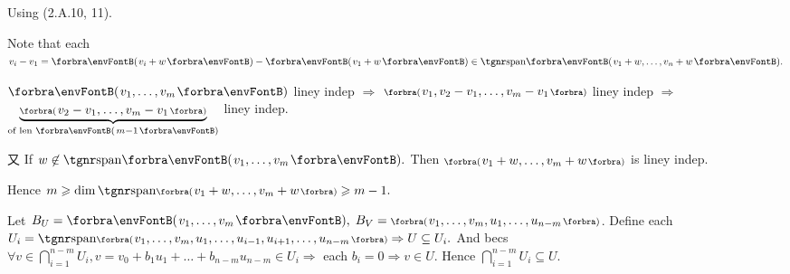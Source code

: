 
\SepLine

Using (2.A.10, 11).\par\quad
Note that each $v_i-v_1=\Par{v_i+w}-\Par{v_1+w}\in\Span{v_1+w,\dots,v_n+w}.$\par\quad
$\Par{v_1,\dots,v_m}$ liney indep $\Rightarrow$ $\BigPar{v_1,v_2-v_1,\dots,v_m-v_1}$ liney indep $\Rightarrow$ $\underbrace{\BigPar{v_2-v_1,_{}\dots,v_m-v_1}}_{\text{of len }\SmallPar{m-1}}$ liney indep.\vspace{-15pt}\par\quad
又 If $w\not\in\Span{v_1,\dots,v_m}.$ Then $\BigPar{v_1+w,\dots,v_m+w}$ is liney indep.\par\quad
Hence $m\geqslant\dim\Span[\BigPar]{v_1+w,\dots,v_m+w}\geqslant m-1.$\PfEnd
\SepLine

Let $B_U=\Par{v_1,\dots,v_m},\;B_V=\BigPar{v_1,\dots,v_m,u_1,\dots,u_{n-m}}$.\parSol{}
Define each $U_i=\Span[\BigPar]{v_1,\dots,v_m,u_1,\dots,u_{i-1},u_{i+1},\dots,u_{n-m}}\Rightarrow U\subseteq U_i.$\vspace{4pt}\parSol{}
And becs $\forall v\in \bigcap\limits_{i=1}^{n-m}U_i,v=v_0+b_1 u_1+\dots+b_{n-m} u_{n-m}\in U_i\Rightarrow$ each $b_i=0\Rightarrow v\in U.$\vspace{-4pt}\parSol{}
Hence $\bigcap\limits_{i=1}^{n-m}U_i\subseteq U.$\PfEnd
\SepLine

